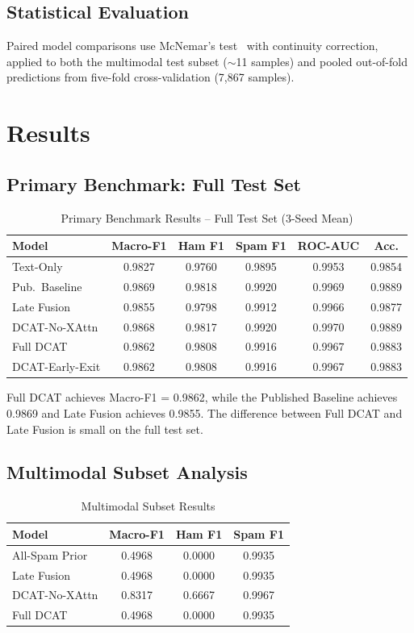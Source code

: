 \documentclass[conference]{IEEEtran}
\begin{document}
\subsection{Statistical Evaluation}
Paired model comparisons use McNemar's test~\cite{ref11} with continuity correction, applied to both the multimodal test subset ($\sim$11 samples) and pooled out-of-fold predictions from five-fold cross-validation (7,867 samples).

\section{Results}
\subsection{Primary Benchmark: Full Test Set}

\begin{table}[htbp]
\centering
\renewcommand{\arraystretch}{1.2}
\caption{Primary Benchmark Results -- Full Test Set (3-Seed Mean)}
\label{tab:2}
\begin{tabular}{lccccc}
\toprule
Model & Macro-F1 & Ham F1 & Spam F1 & ROC-AUC & Acc. \\
\midrule
Text-Only & 0.9827 & 0.9760 & 0.9895 & 0.9953 & 0.9854 \\
Pub.\ Baseline & 0.9869 & 0.9818 & 0.9920 & 0.9969 & 0.9889 \\
Late Fusion & 0.9855 & 0.9798 & 0.9912 & 0.9966 & 0.9877 \\
DCAT-No-XAttn & 0.9868 & 0.9817 & 0.9920 & 0.9970 & 0.9889 \\
Full DCAT & 0.9862 & 0.9808 & 0.9916 & 0.9967 & 0.9883 \\
DCAT-Early-Exit & 0.9862 & 0.9808 & 0.9916 & 0.9967 & 0.9883 \\
\bottomrule
\end{tabular}
\end{table}

Full DCAT achieves Macro-F1 = 0.9862, while the Published Baseline achieves 0.9869 and Late Fusion achieves 0.9855. The difference between Full DCAT and Late Fusion is small on the full test set.

\subsection{Multimodal Subset Analysis}

\begin{table}[htbp]
\centering
\renewcommand{\arraystretch}{1.2}
\caption{Multimodal Subset Results}
\label{tab:3}
\begin{tabular}{lccc}
\toprule
Model & Macro-F1 & Ham F1 & Spam F1 \\
\midrule
All-Spam Prior & 0.4968 & 0.0000 & 0.9935 \\
Late Fusion & 0.4968 & 0.0000 & 0.9935 \\
DCAT-No-XAttn & 0.8317 & 0.6667 & 0.9967 \\
Full DCAT & 0.4968 & 0.0000 & 0.9935 \\
\bottomrule
\end{tabular}
\end{table}
\end{document}
